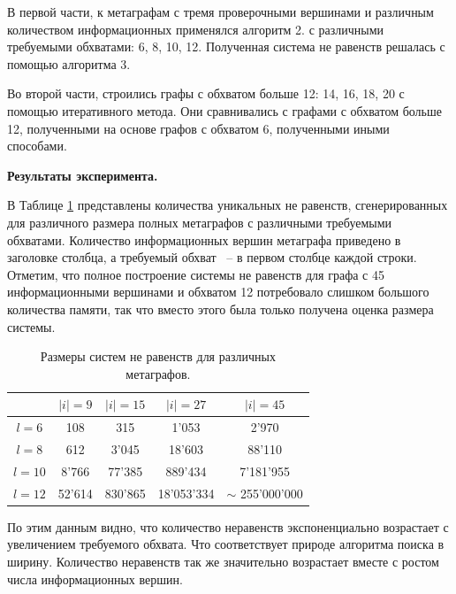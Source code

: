 \documentclass[14pt]{mmcs-article}
\begin{document}
В первой части, к метаграфам с тремя проверочными вершинами и различным количеством информационных применялся алгоритм 2. с различными требуемыми обхватами: 6, 8, 10, 12. Полученная система не равенств решалась с помощью алгоритма 3.

Во второй части, строились графы с обхватом больше 12: 14, 16, 18, 20 с помощью итеративного метода. Они сравнивались с графами с обхватом больше 12, полученными на основе графов с обхватом 6, полученными иными способами.  

\textbf{Результаты эксперимента.}

В Таблице \ref{experiment_label_count_table} представлены количества уникальных не равенств, сгенерированных для различного размера полных метаграфов с различными требуемыми обхватами. Количество информационных вершин метаграфа приведено в заголовке столбца, а требуемый обхват ~-- в первом столбце каждой строки. Отметим, что полное построение системы не равенств для графа с 45 информационными вершинами и обхватом 12  потребовало слишком большого количества памяти, так что вместо этого была только получена оценка размера системы.

\begin{table}[H]
    \centering
    \begin{tabular}{ | c | c | c | c | c | }
        \hline
                   & $|i| = 9$         & $|i| = 15$        & $|i| = 27$      & $|i| = 45$   \\ \hline
        $ l = 6 $  & 108               & 315               & 1'053           & 2'970        \\ \hline
        $ l = 8 $  & 612               & 3'045             & 18'603          & 88'110       \\ \hline
        $ l = 10 $ & 8'766             & 77'385            & 889'434         & 7'181'955    \\ \hline
        $ l = 12 $ & 52'614            & 830'865           & 18'053'334      & $\sim$ 255'000'000 \\ \hline
    \end{tabular}
    \caption{ Размеры систем не равенств для различных метаграфов. }
    \label{experiment_label_count_table}
\end{table}

По этим данным видно, что количество неравенств экспоненциально возрастает с увеличением требуемого обхвата. Что соответствует природе алгоритма поиска в ширину. Количество неравенств так же значительно возрастает вместе с ростом числа информационных вершин. 
\end{document}
